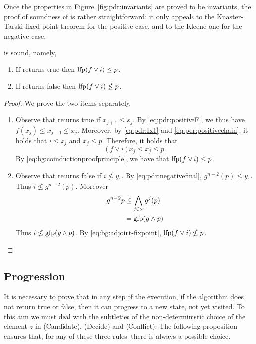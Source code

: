 Once the properties in Figure~\ref{fig:pdr:invariants} are proved to be invariants, the proof of soundness of {\APDR} is rather straightforward: it only appeals to the Knaster-Tarski fixed-point theorem for the positive case, and to the Kleene one for the negative case.

\begin{theorem}[Soundness]\label{th:pdr:soundness}
	\emph {\APDR} is sound, namely,
	\begin{enumerate}
		\item If \emph{\APDR} returns true then $\text{lfp} (f \lor i) \le p$.
		\item If \emph{\APDR} returns false then $\text{lfp} (f \lor i) \nleq p$.
	\end{enumerate}
\end{theorem}
\begin{proof}
	We prove the two items separately.
	\begin{enumerate}
		\item Observe that {\APDR} returns true if $x_{j+1} \le x_j$. By \eqref{eq:pdr:positiveF}, we thus have $f(x_j) \le x_{j+1} \le x_j$. Moreover, by \eqref{eq:pdr:Ix1} and \eqref{eq:pdr:positivechain}, it holds that $i \le x_j$ and $x_j \le p$. Therefore, it holds that
		      \[
		      (f \lor i) x_j \le x_j \le p \text{.}
		      \]
		      By \eqref{eq:bg:coinductionproofprinciple}, we have that $\text{lfp} (f \lor i) \le p$.
		\item Observe that {\APDR} returns false if $i \nleq y_1$. By \eqref{eq:pdr:negativefinal}, $g^{n-2}(p) \le y_1$. Thus $i \nleq g^{n-2}(p)$. Moreover
		      \begin{align*}
			      g^{n-2}p & \le \bigwedge_{j\in \omega} g^{j}(p) \\
			               & = \text{gfp} (g \land p)
		      \end{align*}
		      Thus $i \nleq \text{gfp}(g \land p) $. By \eqref{eq:bg:adjoint-fixpoint}, $\text{lfp}(f \lor i) \nleq p$.
	\end{enumerate}
\end{proof}

\subsection{Progression}\label{sec:pdr:progression}
It is necessary to prove that in any step of the execution, if the algorithm does not return true or false, then it can progress to a new state, not yet visited. To this aim we must deal with the subtleties of the non-deterministic choice of the element $z$ in (Candidate), (Decide) and (Conflict). The following proposition ensures that, for any of these three rules, there is always a possible choice.


